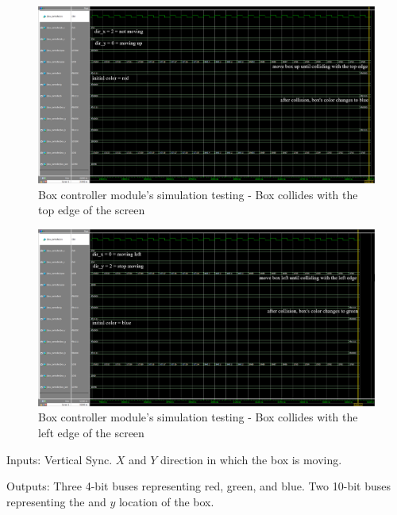 \documentclass[12pt]{article}
\numberwithin{figure}{subsection}
\begin{document}
\begin{figure}[ht]
  \centering
  \includegraphics[width=\textwidth]{box_controller_simulation_collision_with_top_edge.png}
  \caption{Box controller module’s simulation testing - Box collides with the top edge of the screen}
  \label{fig:box_controller_simulation_collision_with_top_edge}
\end{figure}

\begin{figure}[ht!]
  \centering
  \includegraphics[width=\textwidth]{box_controller_simiulation_collision_with_left_edge.png}
  \caption{Box controller module’s simulation testing - Box collides with the left edge of the screen}
  \label{fig:box_controller_simiulation_collision_with_left_edge}
\end{figure}

\newpage

Inputs: Vertical Sync. $X$ and $Y$ direction in which the box is moving.

Outputs: Three 4-bit buses representing red, green, and blue. Two 10-bit buses representing the and $y$ location of the box.
\end{document}
